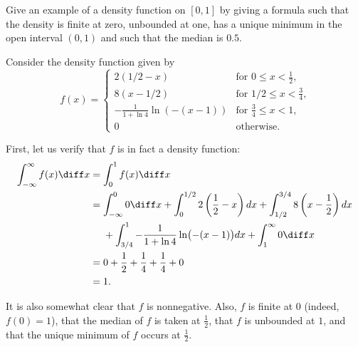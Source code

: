 \begin{problem}[Handout 12, \# 17]
  Give an example of a density function on \([0,1]\) by giving a formula
  such that the density is finite at zero, unbounded at one, has a unique
  minimum in the open interval \((0,1)\) and such that the median is
  \(0.5\).
\end{problem}
\begin{solution}
  Consider the density function given by
  \[
    f(x) =
    \begin{cases}
      2(1/2-x) & \text{for \(0\leq x<\frac{1}{2}\)},\\
      8(x-1/2) & \text{for \(1/2\leq x<\frac{3}{4}\),}\\
      -\frac{1}{1+\ln 4}\ln(-(x-1)) &\text{for \(\frac{3}{4}\leq x<1\)},\\
      0 & \text{otherwise.}
    \end{cases}
  \]

  First, let us verify that \(f\) is in fact a density function:
  \begin{align*}
    \int_{-\infty}^\infty f(x)\diff x
    &=\int_0^1 f(x) \diff x\\
    &=\int_{-\infty}^0 0\diff x
      +\int_0^{1/2} 2\left(\frac{1}{2}-x\right) dx%
      +\int_{1/2}^{3/4} 8\left(x-\frac{1}{2}\right) dx\\
    &\phantom{{}={}}%
      +\int_{3/4}^1-\frac{1}{1+\ln 4}\ln\bigl(-(x-1)\bigr) dx%
      +\int_1^\infty 0\diff x\\
    &=0+\frac{1}{2}+\frac{1}{4}+\frac{1}{4}+0\\
    &=1.
  \end{align*}

  It is also somewhat clear that $f$ is nonnegative. Also, $f$ is finite at
  $0$ (indeed, $f(0) = 1$), that the median of $f$ is taken at
  $\frac{1}{2}$, that $f$ is unbounded at $1$, and that the unique minimum
  of $f$ occurs at $\frac{1}{2}$.
\end{solution}
\newpage


